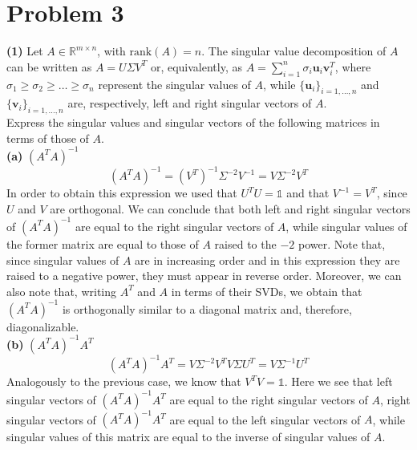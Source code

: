 \documentclass[a4paper,11pt]{article}
\newcommand{\R}{\mathbb{R}}
\begin{document}
\section*{Problem 3}

\noindent \textbf{(1)} Let $A \in \R^{m\times n}$, with $\text{rank}(A) = n$. The singular value decomposition of $A$ can be written as $A = U \Sigma V^T$ or, equivalently, as $A = \sum_{i=1}^n \sigma_i \textbf{u}_i \textbf{v}_i^T$, where $\sigma_1 \ge \sigma_2 \ge \dots \ge \sigma_n$ represent the singular values of $A$, while $\{\textbf{u}_{i}\}_{i=1,\dots,n}$ and $\{\textbf{v}_{i}\}_{i=1,\dots,n}$ are, respectively, left and right singular vectors of $A$.\\

\noindent Express the singular values and singular vectors of the following matrices in terms of those of $A$.\\

\noindent \textbf{(a)} {$(A^{T}A)^{-1}$}
\[(A^{T}A)^{-1} = (V^{T})^{-1}\Sigma^{-2}V^{-1}=V\Sigma^{-2}V^{T}\]
In order to obtain this expression we used that $U^{T}U=\mathbb{1}$ and that $V^{-1}=V^{T}$, since $U$ and $V$ are orthogonal. We can conclude that both left and right singular vectors of $(A^{T}A)^{-1}$ are equal to the right singular vectors of $A$, while singular values of the former matrix are equal to those of $A$ raised to the $-2$ power. Note that, since singular values of $A$ are in increasing order and in this expression they are raised to a negative power, they must appear in reverse order. Moreover, we can also note that, writing $A^{T}$ and $A$ in terms of their SVDs, we obtain that $(A^{T}A)^{-1}$ is orthogonally similar to a diagonal matrix and, therefore, diagonalizable.\\


\noindent \textbf{(b)} $(A^{T}A)^{-1}A^{T}$
\[(A^{T}A)^{-1}A^{T} = V\Sigma^{-2}V^{T}V\Sigma U^{T}=V\Sigma^{-1}U^{T}\]
Analogously to the previous case, we know that $V^{T}V=\mathbb{1}$. Here we see that left singular vectors of $(A^{T}A)^{-1}A^{T}$ are equal to the right singular vectors of $A$, right singular vectors of $(A^{T}A)^{-1}A^{T}$ are equal to the left singular vectors of $A$, while singular values of this matrix are equal to the inverse of singular values of $A$.\\
\end{document}
